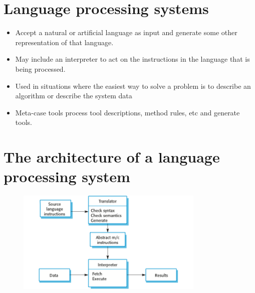 \section{Language processing systems}
\begin{itemize}
\item Accept a natural or artificial language as input and generate some other representation of that language.

\item May include an interpreter to act on the instructions in the language that is being processed.

\item Used in situations where the easiest way to solve a problem is to describe an algorithm or describe the system data

 \item Meta-case tools process tool descriptions, method rules, etc and generate tools.


\end{itemize}
\section{The architecture of a language processing system}
\begin{figure}[h!]
    \centering
    \includegraphics[width = 0.8\textwidth]{./figures/L3_13.png}
    \caption{}
    \label{fig:L3_13}
\end{figure}




